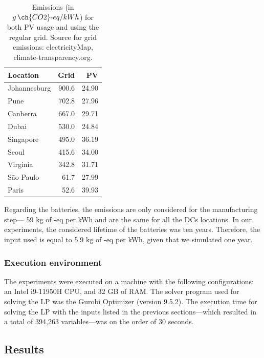 \begin{table}[h]

  \caption{Emissions (in $g\,\ch{CO2}\text{-}eq/kWh$) for both PV usage and using the regular grid. Source for grid emissions: electricityMap, climate-transparency.org.}\label{tab:carbonfootprint} \centering
  \begin{tabular}{|l|r|r|}
    
  \hline
    
  \textbf{Location} &  \textbf{Grid} & \textbf{PV} \\
  \hline
  Johannesburg & 900.6 & 24.90 \\
  \hline
  Pune & 702.8 & 27.96 \\
  \hline
  Canberra & 667.0 & 29.71 \\
  \hline
  Dubai & 530.0  & 24.84 \\
  \hline
  Singapore & 495.0 & 36.19 \\
  \hline     
  Seoul & 415.6 & 34.00 \\
  \hline
  Virginia  & 342.8 & 31.71 \\
  \hline
  São Paulo &  61.7 & 27.99\\
  \hline 
  Paris &  52.6  & 39.93 \\
  \hline  

\end{tabular}  
\end{table}

Regarding the batteries, the emissions are only considered for the manufacturing step--- 59 kg of -eq per kWh and are the same for all the DCs locations. In our experiments, the considered lifetime of the batteries was ten years. Therefore, the input used is equal to 5.9 kg of -eq per kWh, given that we simulated one year.

\subsubsection{Execution environment}
 
The experiments were executed on a machine with the following configurations: an Intel i9-11950H CPU, and 32 GB of RAM. The solver program used for solving the LP was the Gurobi Optimizer (version 9.5.2). The execution time for solving the LP with the inputs listed in the previous sections---which resulted in a total of 394,263 variables---was on the order of 30 seconds.

\subsection{Results}

